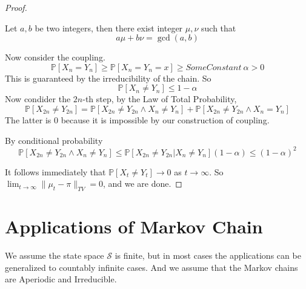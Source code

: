 \begin{proof}
        \begin{lemma}\label{theorem:Bezout}
            Let $a,b$ be two integers, then there exist integer $\mu, \nu$ such that
            \[ a\mu + b\nu = \gcd(a,b) \]
        \end{lemma}

        Now consider the coupling.
        \[ \mathbb{P}[X_n = Y_n] \ge \mathbb{P}[X_n=Y_n=x] \ge SomeConstant~{} \alpha > 0 \]
        This is guaranteed by the irreducibility of the chain.
        So
        \[ \mathbb{P}[X_n \neq Y_n] \le 1 - \alpha \]
        Now condider the $2n$-th step, by the Law of Total Probability,
        \[ \mathbb{P}[X_{2n} \neq Y_{2n}] = \mathbb{P}[X_{2n} \neq Y_{2n} \wedge X_n \neq Y_n] + \mathbb{P}[X_{2n} \neq Y_{2n} \wedge X_n = Y_n] \]
        The latter is $0$ because it is impossible by our construction of coupling.
        
        By conditional probability
        \[ \mathbb{P}[X_{2n} \neq Y_{2n} \wedge X_n \neq Y_n] \le \mathbb{P}[X_{2n} \neq Y_{2n} | X_n \neq Y_n](1-\alpha) \le (1-\alpha)^2 \]

        It follows immediately that $\mathbb{P}[X_t \neq Y_t] \to 0$ as $t \to \infty$. So $\lim_{t\to\infty}\|\mu_t - \pi\|_{TV} = 0$, and we are done.
    \end{proof}


\section{Applications of Markov Chain}
We assume the state space $\mathcal{S}$ is finite, but in most cases the applications can be generalized to countably infinite cases. And we assume that the Markov chains are Aperiodic and Irreducible.

